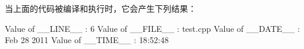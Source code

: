 \documentclass[
]{article}
\newenvironment{Shaded}{}{}
\newcommand{\DecValTok}[1]{\textcolor[rgb]{0.25,0.63,0.44}{#1}}
\newcommand{\NormalTok}[1]{#1}
\newcommand{\OperatorTok}[1]{\textcolor[rgb]{0.40,0.40,0.40}{#1}}
\newcommand{\OtherTok}[1]{\textcolor[rgb]{0.00,0.44,0.13}{#1}}
\begin{document}
当上面的代码被编译和执行时，它会产生下列结果：

\begin{Shaded}
\begin{Highlighting}[]
\NormalTok{Value of }\OtherTok{\_\_LINE\_\_} \OperatorTok{:} \DecValTok{6}
\NormalTok{Value of }\OtherTok{\_\_FILE\_\_} \OperatorTok{:}\NormalTok{ test}\OperatorTok{.}\NormalTok{cpp}
\NormalTok{Value of }\OtherTok{\_\_DATE\_\_} \OperatorTok{:}\NormalTok{ Feb }\DecValTok{28} \DecValTok{2011}
\NormalTok{Value of }\OtherTok{\_\_TIME\_\_} \OperatorTok{:} \DecValTok{18}\OperatorTok{:}\DecValTok{52}\OperatorTok{:}\DecValTok{48}
\end{Highlighting}
\end{Shaded}
\end{document}
